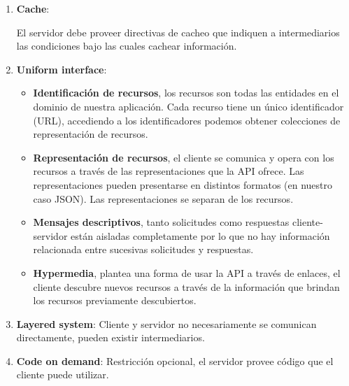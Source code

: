 \begin{itemize}
\begin{enumerate}
    \item \textbf{Cache}:
    
    El servidor debe proveer directivas de cacheo que indiquen a intermediarios las condiciones bajo las cuales cachear información.
    
    \item \textbf{Uniform interface}:
    \begin{itemize}
    	\item \textbf{Identificación de recursos}, los recursos son todas las entidades en el dominio de nuestra aplicación. Cada recurso tiene un único identificador (URL), accediendo a los identificadores podemos obtener colecciones de representación de recursos.
    	
    	\item \textbf{Representación de recursos}, el cliente se comunica y opera con los recursos a través de las representaciones que la API ofrece. Las representaciones pueden presentarse en distintos formatos (en nuestro caso JSON). Las representaciones se separan de los recursos.
    	
    	\item \textbf{Mensajes descriptivos}, tanto solicitudes como respuestas cliente-servidor están aisladas completamente por lo que no hay información relacionada entre sucesivas solicitudes y respuestas.
    	
    	\item \textbf{Hypermedia}, plantea una forma de usar la API a través de enlaces, el cliente descubre nuevos recursos a través de la información que brindan los recursos previamente descubiertos.
    \end{itemize}
    
    \item \textbf{Layered system}:
    Cliente y servidor no necesariamente se comunican directamente, pueden existir intermediarios.
    
    \item \textbf{Code on demand}:
    Restricción opcional, el servidor provee código que el cliente puede utilizar.
    
\end{enumerate}
\end{itemize}

\begin{comment}
		imagen directorios	contenidos...
\end{comment}

